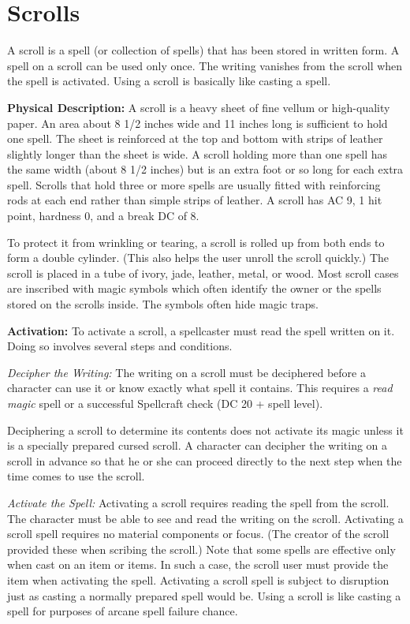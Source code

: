 
\section{Scrolls}

A scroll is a spell (or collection of spells) that has been stored in written form. 
A spell on a scroll can be used only once. The writing vanishes from the scroll 
when the spell is activated. Using a scroll is basically like casting a spell.

\textbf{Physical Description:} A scroll is a heavy sheet of fine vellum or high-quality 
paper. An area about 8 1/2 inches wide and 11 inches long is sufficient to hold 
one spell. The sheet is reinforced at the top and bottom with strips of leather 
slightly longer than the sheet is wide. A scroll holding more than one spell has 
the same width (about 8 1/2 inches) but is an extra foot or so long for each extra 
spell. Scrolls that hold three or more spells are usually fitted with reinforcing 
rods at each end rather than simple strips of leather. A scroll has AC 9, 1 hit 
point, hardness 0, and a break DC of 8.

To protect it from wrinkling or tearing, a scroll is rolled up from both ends to 
form a double cylinder. (This also helps the user unroll the scroll quickly.) The 
scroll is placed in a tube of ivory, jade, leather, metal, or wood. Most scroll 
cases are inscribed with magic symbols which often identify the owner or the spells 
stored on the scrolls inside. The symbols often hide magic traps.

\textbf{Activation:} To activate a scroll, a spellcaster must read the spell written 
on it. Doing so involves several steps and conditions.

\textit{Decipher the Writing: }The writing on a scroll must be deciphered before 
a character can use it or know exactly what spell it contains. This requires a 
\textit{read magic }spell or a successful Spellcraft check (DC 20 + spell level). 

Deciphering a scroll to determine its contents does not activate its magic unless 
it is a specially prepared cursed scroll. A character can decipher the writing 
on a scroll in advance so that he or she can proceed directly to the next step 
when the time comes to use the scroll.

\textit{Activate the Spell: }Activating a scroll requires reading the spell from 
the scroll. The character must be able to see and read the writing on the scroll. 
Activating a scroll spell requires no material components or focus. (The creator 
of the scroll provided these when scribing the scroll.) Note that some spells are 
effective only when cast on an item or items. In such a case, the scroll user must 
provide the item when activating the spell. Activating a scroll spell is subject 
to disruption just as casting a normally prepared spell would be. Using a scroll 
is like casting a spell for purposes of arcane spell failure chance.

